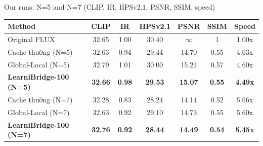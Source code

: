 \begin{frame}{Our runs: N=5 and N=7 (CLIP, IR, HPSv2.1, PSNR, SSIM, speed)}
\begin{center}\scriptsize
\setlength{\tabcolsep}{3pt}
\renewcommand{\arraystretch}{1.15}
\begin{tabular}{lcccccc}
\toprule
Method & \textbf{CLIP} & \textbf{IR} & \textbf{HPSv2.1} & \textbf{PSNR} & \textbf{SSIM} & \textbf{Speed} \\
\midrule
Original FLUX & 32.65 & 1.00 & 30.40 & $\infty$ & 1 & 1.00x \\
Cache thường (N=5) & 32.63 & 0.94 & 29.44 & 14.70 & 0.55 & 4.63x \\
Global-Local (N=5) & 32.79 & 1.01 & 30.00 & 15.21 & 0.57 & 4.60x \\
\textbf{\textcolor{wrsBlue}{LearniBridge-100 (N=5)}}\newline{\tiny\color{wrsMuted}(paper method)} & \textbf{\textcolor{wrsBlue}{32.66}} & \textbf{\textcolor{wrsBlue}{0.98}} & \textbf{\textcolor{wrsBlue}{29.53}} & \textbf{\textcolor{wrsBlue}{15.07}} & \textbf{\textcolor{wrsBlue}{0.55}} & \textbf{\textcolor{wrsBlue}{4.49x}} \\
Cache thường (N=7) & 32.28 & 0.83 & 28.24 & 14.14 & 0.52 & 5.66x \\
Global-Local (N=7) & 32.63 & 0.92 & 29.10 & 14.73 & 0.55 & 5.60x \\
\textbf{\textcolor{wrsBlue}{LearniBridge-100 (N=7)}}\newline{\tiny\color{wrsMuted}(paper method)} & \textbf{\textcolor{wrsBlue}{32.76}} & \textbf{\textcolor{wrsBlue}{0.92}} & \textbf{\textcolor{wrsBlue}{28.44}} & \textbf{\textcolor{wrsBlue}{14.49}} & \textbf{\textcolor{wrsBlue}{0.54}} & \textbf{\textcolor{wrsBlue}{5.45x}} \\
\bottomrule
\end{tabular}
\end{center}
\vspace{0.25em}
\vspace{0.25em}
\end{frame}

